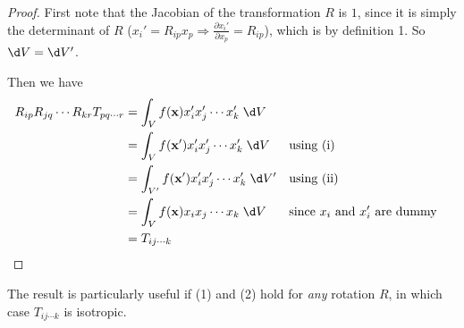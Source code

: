 \documentclass[a4paper]{article}
\begin{document}
\begin{proof}
  First note that the Jacobian of the transformation $R$ is $1$, since it is simply the determinant of $R$ ($x_i' = R_{ip}x_p \Rightarrow \frac{\partial x_i'}{\partial x_p} = R_{ip}$), which is by definition 1. So $\d V = \d V'$.

  Then we have
  \begin{align*}
    R_{ip}R_{jq}\cdots R_{kr} T_{pq\cdots r} &= \int_V f(\mathbf{x})x_i' x_j' \cdots x_k' \;\d V\\
    &= \int_V f(\mathbf{x}')x_i' x_j' \cdots x_k'\;\d V&&\text{using (i)}\\
    &= \int_{V'} f(\mathbf{x}') x_i' x_j' \cdots x_k' \;\d V'&&\text{using (ii)}\\
    &= \int_{V} f(\mathbf{x}) x_i x_j \cdots x_k \;\d V&&\text{since $x_i$ and $x_i'$ are dummy}\\
    &= T_{ij\cdots k}
  \end{align*}
\end{proof}

The result is particularly useful if (1) and (2) hold for \emph{any} rotation $R$, in which case $T_{ij\cdots k}$ is isotropic.
\end{document}
